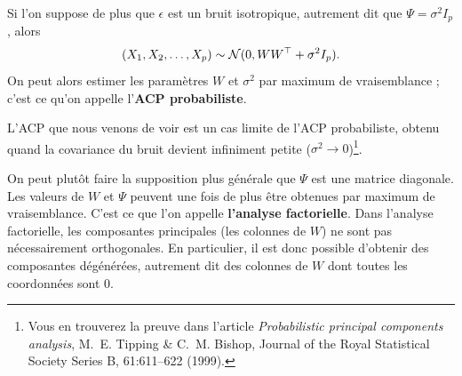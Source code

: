 Si l'on suppose de plus que $\epsilon$ est un bruit isotropique, autrement dit
que $\Psi = \sigma^2 I_p$, alors 
\[
  (X_1, X_2, \dots, X_p) \sim \mathcal{N} (0, WW^\top + \sigma^2 I_p).
\] 
On peut alors estimer les paramètres $W$ et $\sigma^2$ par maximum de
vraisemblance ; c'est ce qu'on appelle l'\textbf{ACP probabiliste}.

L'ACP que nous venons de voir est un cas limite de l'ACP probabiliste, obtenu
quand la covariance du bruit devient infiniment petite
($\sigma^2 \rightarrow 0$)\footnote{Vous en trouverez la preuve dans l'article
  \textit{Probabilistic principal components analysis}, M.~E. Tipping \&
  C.~M. Bishop,  Journal of the Royal
    Statistical Society Series B, 61:611--622 (1999).}.

On peut plutôt faire la supposition plus générale que $\Psi$ est une matrice
diagonale. Les valeurs de $W$ et $\Psi$ peuvent une fois de plus
être obtenues par maximum de vraisemblance. C'est ce que l'on appelle
\textbf{l'analyse factorielle}.  Dans l'analyse factorielle, les composantes
principales (les colonnes de $W$) ne sont pas nécessairement orthogonales. En
particulier, il est donc possible d'obtenir des composantes dégénérées,
autrement dit des colonnes de $W$ dont toutes les coordonnées sont $0$.

